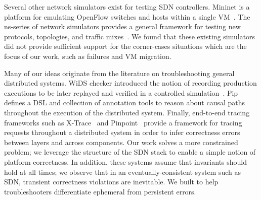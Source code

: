 {Several other network simulators exist for testing SDN controllers. Mininet is a
platform for emulating OpenFlow switches and hosts within a single
 VM~\cite{Lantz:2010:NLR:1868447.1868466}. The ns-series of network simulators
provides a general framework for testing new protocols, topologies,
and traffic mixes~\cite{ns3}. We found that these existing simulators did
not provide sufficient support for the corner-cases situations which are the
focus of our work, such as failures and VM migration.

Many of our ideas originate from the literature on troubleshooting general
distributed systems. WiDS checker introduced the notion of recording
production executions to be later replayed and verified in a controlled simulation~\cite{Liu07widschecker:}.
Pip~\cite{pip} defines a DSL and collection of annotation tools to
reason about causal paths throughout the execution of the
distributed system. Finally, end-to-end tracing
frameworks such as X-Trace~\cite{Fonseca:2007:XPN:1973430.1973450} and
Pinpoint~\cite{Chen02pinpoint:problem} provide a framework for tracing requests throughout
a distributed system in order to infer correctness errors between layers and
across components. Our work solves a more constrained problem; we leverage
the structure of the SDN stack to enable a simple notion of platform
correctness. In addition, these systems assume that invariants should hold at
all times; we observe that in an eventually-consistent system such as SDN,
transient correctness violations are inevitable. We built \simulator{} to help troubleshooters
differentiate ephemeral from persistent errors.


}
